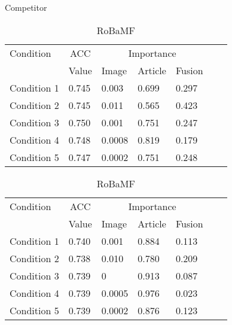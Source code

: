 \begin{table}[htbp]
\centering
\begin{minipage}[t]{0.45\textwidth}
\centering
\caption{Competitor}
\label{tab:competitor}
\begin{tabular}{@{}lllllll@{}}
\toprule
Condition       & \multicolumn{1}{c|}{ACC} & \multicolumn{3}{c}{Importance} \\
             & Value      & Image      & Article      & Fusion     \\
\midrule
Condition 1   & 0.745         & 0.003         & 0.699         & 0.297       \\
Condition 2   & 0.745         & 0.011         & 0.565         & 0.423       \\
Condition 3   & 0.750         & 0.001         & 0.751         & 0.247       \\
Condition 4   & 0.748         & 0.0008        & 0.819         & 0.179       \\
Condition 5   & 0.747         & 0.0002        & 0.751         & 0.248       \\
\bottomrule
\end{tabular}
\end{minipage}
\hfill
\begin{minipage}[t]{0.45\textwidth}
\centering
\caption{RoBaMF}
\label{tab:robamf}
\begin{tabular}{@{}lllllll@{}}
\toprule
Condition       & \multicolumn{1}{c|}{ACC} & \multicolumn{3}{c}{Importance} \\
             & Value      & Image      & Article      & Fusion     \\
\midrule
Condition 1   & 0.740         & 0.001         & 0.884         & 0.113       \\
Condition 2   & 0.738         & 0.010         & 0.780         & 0.209       \\
Condition 3   & 0.739         & 0              & 0.913         & 0.087       \\
Condition 4   & 0.739         & 0.0005        & 0.976         & 0.023       \\
Condition 5   & 0.739         & 0.0002        & 0.876         & 0.123       \\
\bottomrule
\end{tabular}
\end{minipage}
\end{table}




